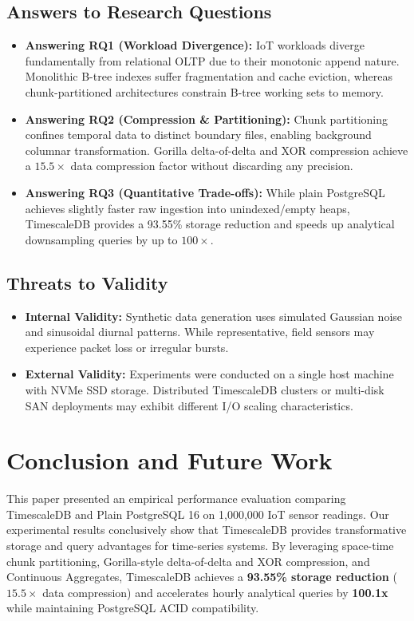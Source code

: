 \documentclass[conference,a4paper]{IEEEtran}
\begin{document}
\subsection{Answers to Research Questions}
\begin{itemize}
    \item \textbf{Answering RQ1 (Workload Divergence):} IoT workloads diverge fundamentally from relational OLTP due to their monotonic append nature. Monolithic B-tree indexes suffer fragmentation and cache eviction, whereas chunk-partitioned architectures constrain B-tree working sets to memory.
    \item \textbf{Answering RQ2 (Compression \& Partitioning):} Chunk partitioning confines temporal data to distinct boundary files, enabling background columnar transformation. Gorilla delta-of-delta and XOR compression achieve a $15.5\times$ data compression factor without discarding any precision.
    \item \textbf{Answering RQ3 (Quantitative Trade-offs):} While plain PostgreSQL achieves slightly faster raw ingestion into unindexed/empty heaps, TimescaleDB provides a 93.55\% storage reduction and speeds up analytical downsampling queries by up to $100\times$.
\end{itemize}

\subsection{Threats to Validity}
\begin{itemize}
    \item \textbf{Internal Validity:} Synthetic data generation uses simulated Gaussian noise and sinusoidal diurnal patterns. While representative, field sensors may experience packet loss or irregular bursts.
    \item \textbf{External Validity:} Experiments were conducted on a single host machine with NVMe SSD storage. Distributed TimescaleDB clusters or multi-disk SAN deployments may exhibit different I/O scaling characteristics.
\end{itemize}

\section{Conclusion and Future Work}
This paper presented an empirical performance evaluation comparing TimescaleDB and Plain PostgreSQL 16 on 1,000,000 IoT sensor readings. Our experimental results conclusively show that TimescaleDB provides transformative storage and query advantages for time-series systems. By leveraging space-time chunk partitioning, Gorilla-style delta-of-delta and XOR compression, and Continuous Aggregates, TimescaleDB achieves a \textbf{93.55\% storage reduction} ($15.5\times$ data compression) and accelerates hourly analytical queries by \textbf{100.1x} while maintaining PostgreSQL ACID compatibility.
\end{document}

